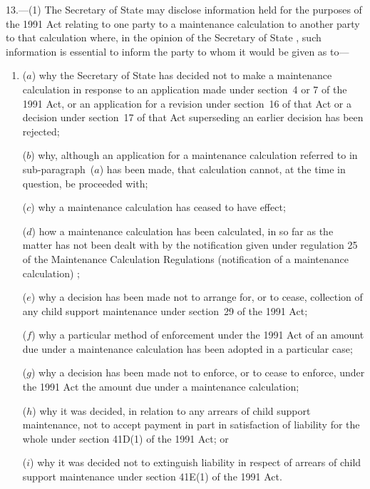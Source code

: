 \documentclass[12pt,a4paper]{article}
\begin{document}
13.---(1)  The 
Secretary of State  %
may disclose information held for the purposes of the 1991 Act relating to one party to a maintenance calculation to another party to that calculation where, in the opinion of the 
Secretary of State%
, such information is essential to inform the party to whom it would be given as to—
\begin{enumerate}\item[]
($a$) why 
the Secretary of State  %
has decided not to make a maintenance calculation in response to an application made under section~4 or 7 of the 1991 Act, or an application for a revision under section~16 of that Act or a decision under section~17 of that Act superseding an earlier decision has been rejected;

($b$) why, although an application for a maintenance calculation referred to in sub-paragraph~($a$)  has been made, that calculation cannot, at the time in question, be proceeded with;

($c$) why a maintenance calculation has ceased to have effect;

($d$) how a maintenance calculation has been calculated, in so far as the matter has not been dealt with by the notification given under 
regulation 25 of the Maintenance Calculation Regulations (notification of a maintenance calculation)%
;

($e$) why a decision has been made not to arrange for, or to cease, collection of any child support maintenance under section~29 of the 1991 Act;

($f$) why a particular method of enforcement under the 1991 Act of an amount due under a maintenance calculation has been adopted in a particular case;

($g$) why a decision has been made not to enforce, or to cease to enforce, under the 1991 Act the amount due under a maintenance calculation;

($h$) why it was decided, in relation to any arrears of child support maintenance, not to accept payment in part in satisfaction of liability for the whole under section 41D(1) of the 1991 Act; or

($i$) why it was decided not to extinguish liability in respect of arrears of child support maintenance under section 41E(1) of the 1991 Act.

\end{enumerate}
\end{document}
